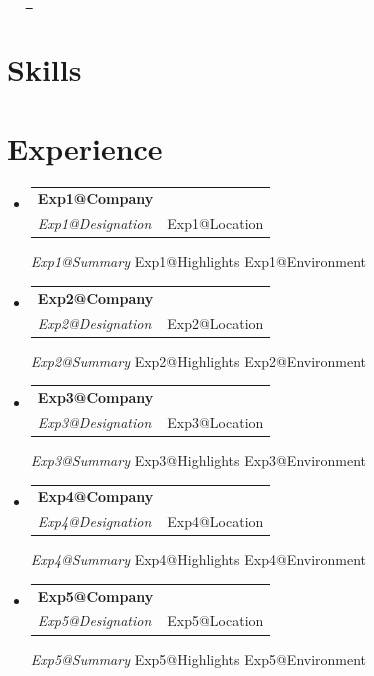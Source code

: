 \documentclass[letterpaper,11pt]{article}
\makeatletter
\newcommand{\describe}[2]{
    \csname #1@#2\endcsname
}
\newcommand{\resumeSubheading}[4]{
  \vspace{-2pt}\item
  \begin{tabular*}{\textwidth}[t]{l@{\extracolsep{\fill}}r}
    \textbf{#1} & \textbf{\small #2} \\
    \textit{\small #3} & {\small #4} \\
  \end{tabular*}\vspace{-4pt}
}
\newcommand{\resumeSubHeadingListStart}{\begin{itemize}[leftmargin=0.0in, label={}]}
\newcommand{\resumeSubHeadingListEnd}{\end{itemize}}
\def\titlesection{
\begin{center}
    {\Huge \scshape \firstname \ \lastname} \\ \vspace{1pt}
    \small \raisebox{-0.1\height}\faPhone\ \jasphone ~ \href{mailto:\email}{\raisebox{-0.2\height}\faEnvelope\  \underline{\email}} 
    \vspace{-8pt}
\end{center}
}
\makeatother
\begin{document}
\titlesection
\profileSummary





\section{Skills}
\skills


\newcommand{\renderExp}[1]{
\resumeSubheading
        {\csname #1@Company\endcsname}
        {\makebox[0.35\textwidth][r]{\csname #1@Start\endcsname -- \csname #1@End\endcsname}}
        {\csname #1@Designation\endcsname}
        {\csname #1@Location\endcsname}
        {\small \textit{\csname #1@Summary\endcsname}}  %
        \csname #1@Highlights\endcsname
        \vspace{2pt}
        {\small \csname #1@Environment\endcsname}         %
}


\section{Experience}
    \resumeSubHeadingListStart
        \renderExp{Exp1}
        \vspace{6pt} %
        \renderExp{Exp2}
        \renderExp{Exp3}  
        \renderExp{Exp4}  
        \renderExp{Exp5}  
  \resumeSubHeadingListEnd

\end{document}
